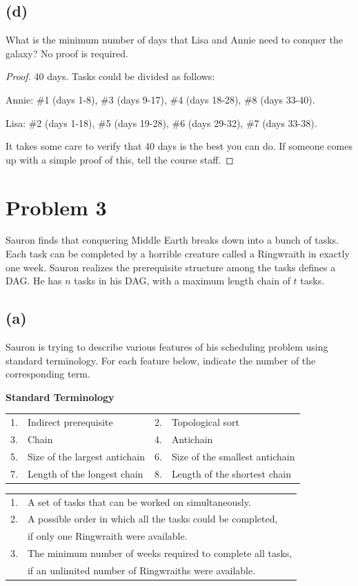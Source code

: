 \documentclass[14pt]{extarticle}
\begin{document}
\subsection{(d)}
What is the minimum number of days that Lisa and Annie need to conquer the galaxy? No proof is required.
\begin{proof}
40 days. Tasks could be divided as follows:

Annie: \#1 (days 1-8), \#3 (days 9-17), \#4 (days 18-28), \#8 (days 33-40).

Lisa: \#2 (days 1-18), \#5 (days 19-28), \#6 (days 29-32), \#7 (days 33-38).

It takes some care to verify that 40 days is the best you can do. If someone comes up with a simple proof of this, tell the course staff.
\end{proof}

\section{Problem 3}
Sauron finds that conquering Middle Earth breaks down into a bunch of tasks. Each task can be completed by a horrible creature called a Ringwraith in exactly one week. Sauron realizes the prerequisite structure among the tasks defines a DAG. He has $n$ tasks in his DAG, with a maximum length chain of $t$ tasks.

\subsection{(a)}
Sauron is trying to describe various features of his scheduling problem using standard terminology. For each feature below, indicate the number of the corresponding term.

\begin{center}
{\bf Standard Terminology}
\begin{tabular}{llll}
1. & Indirect prerequisite & 2. & Topological sort \\
3. & Chain & 4. & Antichain \\
5. & Size of the largest antichain & 6. & Size of the smallest antichain \\
7. & Length of the longest chain & 8. & Length of the shortest chain \\
\end{tabular}
\end{center}

\begin{tabular}{ll}
1. & A set of tasks that can be worked on simultaneously. \\

2. & A possible order in which all the tasks could be completed, \\

& if only one Ringwraith were available. \\

3. & The minimum number of weeks required to complete all tasks, \\
& if an unlimited number of Ringwraiths were available.
\end{tabular}
\end{document}
